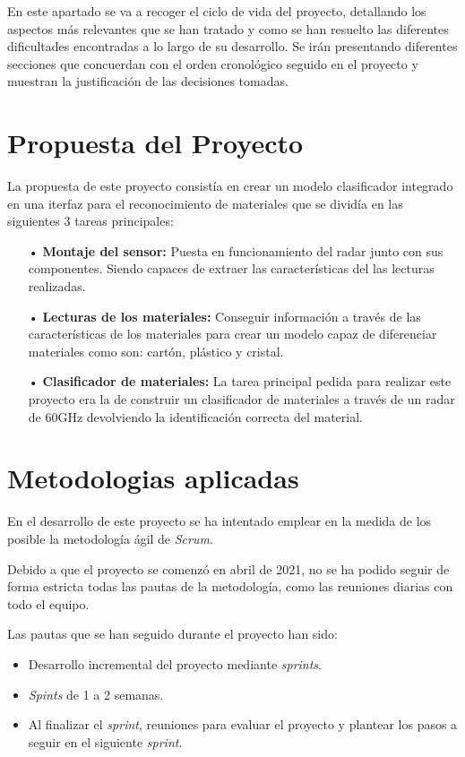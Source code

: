 
En este apartado se va a recoger el ciclo de vida del proyecto, detallando los aspectos más relevantes que se han tratado y como se han resuelto las diferentes dificultades encontradas a lo largo de su desarrollo. Se irán presentando diferentes secciones que concuerdan con el orden cronológico seguido en el proyecto y muestran la justificación de las decisiones tomadas.

\section{Propuesta del Proyecto}

La propuesta de este proyecto consistía en crear un modelo clasificador integrado en una iterfaz para el reconocimiento de materiales que se dividía en las siguientes 3 tareas principales:

\begin{itemize}
\item[•] \textbf{Montaje del sensor:} Puesta en funcionamiento del radar junto con sus componentes. Siendo capaces de extraer las características del las lecturas realizadas.

\item[•] \textbf{Lecturas de los materiales:} Conseguir información a través de las características de los materiales para crear un modelo capaz de diferenciar materiales como son: cartón, plástico y cristal.

\item[•] \textbf{Clasificador de materiales:} La tarea principal pedida para realizar este proyecto era la de construir un clasificador de materiales a través de un radar de 60GHz devolviendo la identificación correcta del material.
\end{itemize}

\section{Metodologias aplicadas}

En el desarrollo de este proyecto se ha intentado emplear en la medida de los posible la metodología ágil de \textit{Scrum}.

Debido a que el proyecto se comenzó en abril de 2021, no se ha podido seguir de forma estricta todas las pautas de la metodología, como las reuniones diarias con todo el equipo. 

Las pautas que se han seguido durante el proyecto han sido:
\begin{itemize}
\item Desarrollo incremental del proyecto mediante \textit{sprints}. 
\item \textit{Spints} de 1 a 2 semanas. 
\item Al finalizar el \textit{sprint}, reuniones para evaluar el proyecto y plantear los pasos a seguir en el siguiente \textit{sprint}.
\end{itemize}

